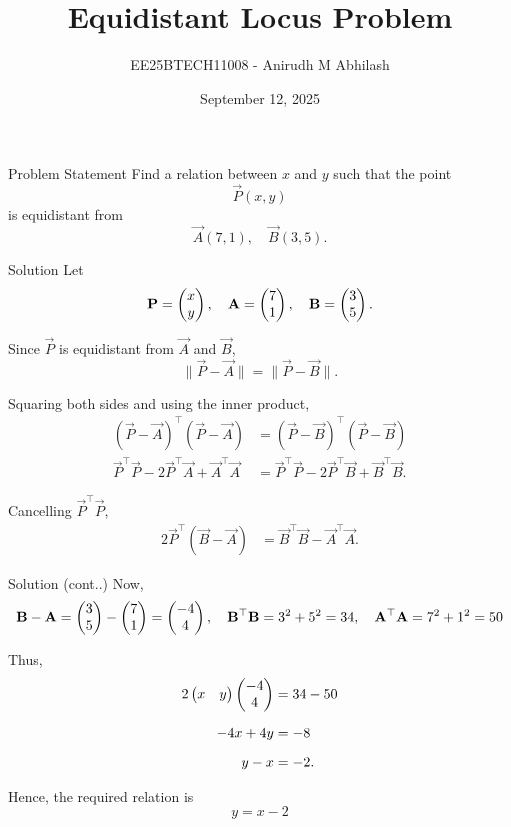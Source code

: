 \documentclass{beamer}
\title{Equidistant Locus Problem}
\author{EE25BTECH11008 - Anirudh M Abhilash}
\date{September 12, 2025}
\begin{document}
\begin{frame}
\titlepage
\end{frame}

\begin{frame}{Problem Statement}
Find a relation between $x$ and $y$ such that the point
\[
\vec{P}(x,y)
\]
is equidistant from
\[
\vec{A}(7,1), \quad \vec{B}(3,5).
\]
\end{frame}

\begin{frame}{Solution}
Let 
\[
\mathbf{P} = \begin{pmatrix}x \\ y\end{pmatrix}, \quad \mathbf{A} = \begin{pmatrix}7 \\ 1\end{pmatrix}, \quad \mathbf{B} = \begin{pmatrix}3 \\ 5\end{pmatrix}.
\]

Since $\vec{P}$ is equidistant from $\vec{A}$ and $\vec{B}$,
\[
\|\vec{P} - \vec{A}\| = \|\vec{P} - \vec{B}\|.
\]

Squaring both sides and using the inner product,
\begin{align}
(\vec{P} - \vec{A})^\top(\vec{P} - \vec{A}) &= (\vec{P} - \vec{B})^\top(\vec{P} - \vec{B}) \\[6pt]
\vec{P}^\top \vec{P} - 2\vec{P}^\top \vec{A} + \vec{A}^\top \vec{A} 
&= \vec{P}^\top \vec{P} - 2\vec{P}^\top \vec{B} + \vec{B}^\top \vec{B}.
\end{align}

Cancelling $\vec{P}^\top \vec{P}$,
\begin{align}
2\vec{P}^\top(\vec{B}-\vec{A}) &= \vec{B}^\top \vec{B} - \vec{A}^\top \vec{A}.
\end{align}

\end{frame}

\begin{frame}{Solution (cont..)}
Now,
\[
\mathbf{B} - \mathbf{A} = \begin{pmatrix}3 \\ 5\end{pmatrix} - \begin{pmatrix}7 \\ 1\end{pmatrix} = \begin{pmatrix}-4 \\ 4\end{pmatrix}, 
\quad \mathbf{B}^\top \mathbf{B} = 3^2 + 5^2 = 34, 
\quad \mathbf{A}^\top \mathbf{A} = 7^2 + 1^2 = 50
\]

Thus,
\begin{align}
2\begin{pmatrix}x & y\end{pmatrix}\begin{pmatrix}-4 \\ 4\end{pmatrix} &= 34 - 50 \\[6pt]
-4x + 4y &= -8 \\[6pt]
y - x &= -2.
\end{align}

Hence, the required relation is
\[
\boxed{y = x - 2}
\]

\end{frame}
\end{document}

